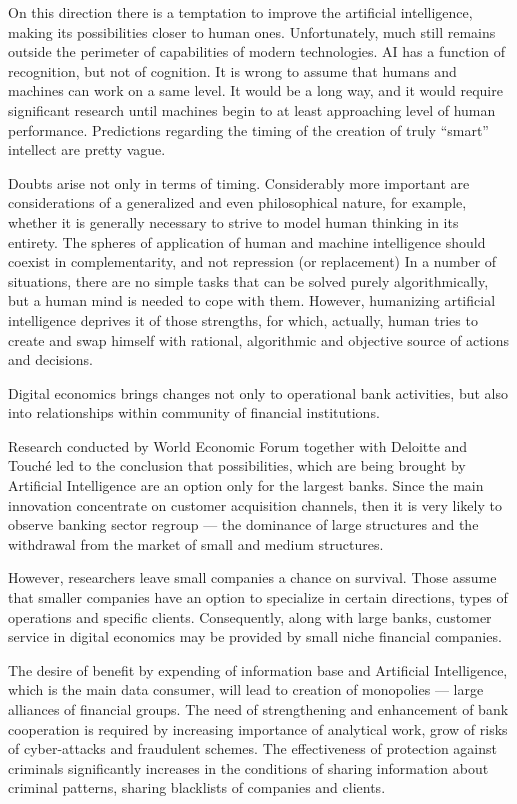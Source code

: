 On this direction there is a temptation to improve the artificial intelligence, making its possibilities closer to human ones. 
Unfortunately, much still remains outside the perimeter of capabilities of modern technologies.
AI has a function of recognition, but not of cognition. 
It is wrong to assume that humans and machines can work on a same level.
It would be a long way, and it would require significant research until machines begin to at least approaching level of human performance.
Predictions regarding the timing of the creation of truly “smart” intellect are pretty vague.
\cite{ai_reality_hype}


Doubts arise not only in terms of timing.
Considerably more important are considerations of a generalized and even philosophical nature, for example, whether it is generally necessary to strive to model human thinking in its entirety.
The spheres of application of human and machine intelligence should coexist in complementarity, and not repression (or replacement)
In a number of situations, there are no simple tasks that can be solved purely algorithmically, but a human mind is needed to cope with them.
However, humanizing artificial intelligence deprives it of those strengths, for which, actually, human tries to create and swap himself with rational, algorithmic and objective source of actions and decisions.

Digital economics brings changes not only to operational bank activities, but also into relationships within community of financial institutions.

Research conducted by World Economic Forum together with Deloitte and Touché led to the conclusion that possibilities, which are being brought by Artificial Intelligence are an option only for the largest banks.
Since the main innovation concentrate on customer acquisition channels, then it is very likely to observe banking sector regroup — the dominance of large structures and the withdrawal from the market of small and medium structures.
\cite{ai_transform_disrupt}

However, researchers leave small companies a chance on survival.
Those assume that smaller companies have an option to specialize in certain directions, types of operations and specific clients.
Consequently, along with large banks, customer service in digital economics may be provided by small niche financial companies.
\cite{banking_ai_revolution}

The desire of benefit by expending of information base and Artificial Intelligence, which is the main data consumer, will lead to creation of monopolies — large alliances of financial groups.
The need of strengthening and enhancement of bank cooperation is required by increasing importance of analytical work, grow of risks of cyber-attacks and fraudulent schemes. 
The effectiveness of protection against criminals significantly increases in the conditions of sharing information about criminal patterns, sharing blacklists of companies and clients.

